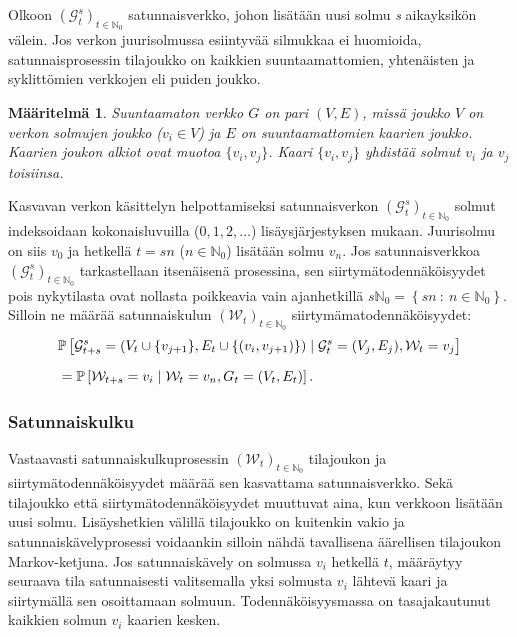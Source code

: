 \documentclass[finnish, 12pt, a4paper, sci, utf8, pdfa]{aaltothesis}
\newcommand{\N}{\mathbb{N}}
\newcommand{\Grandom}{\mathcal{G}}
\newcommand{\Wrandom}{\mathcal{W}}
\newcommand*{\prob}{\mathbb{P}}
\newtheorem{definition}{Määritelmä}
\begin{document}
Olkoon \( (\Grandom_{t}^{s})_{t \in \N_{0}} \) satunnaisverkko, johon lisätään uusi solmu \textit{s} aikayksikön välein. Jos verkon juurisolmussa esiintyvää silmukkaa ei huomioida, satunnaisprosessin tilajoukko on kaikkien suuntaamattomien, yhtenäisten ja syklittömien verkkojen eli puiden joukko.
\begin{definition}
   \label{definition:verkko}
Suuntaamaton verkko $ G $ on pari $ (V, E) $, missä joukko $ V $ on verkon solmujen joukko (\( v_{i} \in V \)) ja $ E $ on suuntaamattomien kaarien joukko. Kaarien joukon alkiot ovat muotoa \( \{ v_{i}, v_{j} \} \). Kaari \( \{ v_{i}, v_{j} \} \) yhdistää solmut \( v_{i} \) ja \( v_{j} \) toisiinsa. 
\end{definition}
Kasvavan verkon käsittelyn helpottamiseksi satunnaisverkon \( (\Grandom_{t}^{s})_{t \in \N_{0}} \) solmut indeksoidaan kokonaisluvuilla (\( 0, 1, 2, \ldots \)) lisäysjärjestyksen mukaan. Juurisolmu on siis \( v_{0} \) ja hetkellä \( t = sn \) (\( n \in \N_{0} \)) lisätään solmu \( v_{n} \). Jos satunnaisverkkoa \( (\Grandom_{t}^{s})_{t \in \N_{0}} \) tarkastellaan itsenäisenä prosessina, sen siirtymätodennäköisyydet pois nykytilasta ovat nollasta poikkeavia vain ajanhetkillä \( s\N_{0} = \left\{ sn \: : \: n \in \N_{0} \right\} \). Silloin ne määrää satunnaiskulun \( (\Wrandom_{t})_{t \in \N_{0}} \) siirtymämatodennäköisyydet:
\begin{equation}
   \setlength{\jot}{10pt}
   \begin{aligned}
   & \prob \left[ \Grandom_{t+s}^{s} = (V_{t} \cup \{ v_{j + 1} \}, E_{t} \cup \{ (v_{i}, v_{j + 1}) \}) \mid \Grandom_{t}^{s} = (V_{j}, E_{j}), \Wrandom_{t} = v_{j} \right] \\
   &= \prob \left[ \Wrandom_{t+s} = v_{i} \mid \Wrandom_{t} = v_{n}, G_{t} = (V_{t}, E_{t}) \right].
   \end{aligned}
\end{equation}

\subsubsection{Satunnaiskulku}

Vastaavasti satunnaiskulkuprosessin \( (\Wrandom_{t})_{t \in \N_{0}} \) tilajoukon ja siirtymätodennäköisyydet määrää sen kasvattama satunnaisverkko. Sekä tilajoukko että siirtymätodennäköisyydet muuttuvat aina, kun verkkoon lisätään uusi solmu. Lisäyshetkien välillä tilajoukko on kuitenkin vakio ja satunnaiskävelyprosessi voidaankin silloin nähdä tavallisena äärellisen tilajoukon Markov-ketjuna. Jos satunnaiskävely on solmussa \( v_{i} \) hetkellä \( t \), määräytyy seuraava tila satunnaisesti valitsemalla yksi solmusta \( v_{i} \) lähtevä kaari ja siirtymällä sen osoittamaan solmuun. Todennäköisyysmassa on tasajakautunut kaikkien solmun \( v_{i} \) kaarien kesken. 
\end{document}
